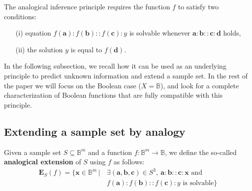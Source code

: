 \documentclass[article]{amsart}
\begin{document}
The analogical inference principle requires the function $f$ to satisfy
two conditions:
\begin{itemize}
\item[(i)] equation $f(\mathbf{a}) : f(\mathbf{b}) :: f(\mathbf{c}) : y$ is
  solvable whenever $\mathbf{a} :  \mathbf{b} ::  \mathbf{c} :  \mathbf{d}$ holds,
\item[(ii)] the solution $y$ is equal to $f(\mathbf{d})$.
\end{itemize}

In the following subsection, we recall how it can be used as an underlying
principle to predict unknown information and extend a sample set. In the rest of
the paper we will focus on the Boolean case ($X = \mathbb{B}$), and look for a
complete characterization of Boolean functions that are fully compatible
with this principle.

\subsection{Extending  a sample set by analogy}\label{analogy-extension}

Given a sample set $S \subseteq \mathbb{B}^m$ and
a function $f\colon \mathbb{B}^m\to \mathbb{B}$, we define the so-called {\bf
analogical extension}
of $S$ using $f$ as follows:
\begin{align*}
  \mathbf{E}_S(f)=\{ \mathbf{x} \in \mathbb{B}^m \, | \,  &\exists
(\mathbf{a},\mathbf{b},\mathbf{c}) \in S^3, ~
  \mathbf{a} : \mathbf{b} :: \mathbf{c} : \mathbf{x} \mbox{ and } \\
  &f(\mathbf{a}) : f(\mathbf{b}) :: f(\mathbf{c}) : y \text { is solvable}\}
\end{align*}
\end{document}
